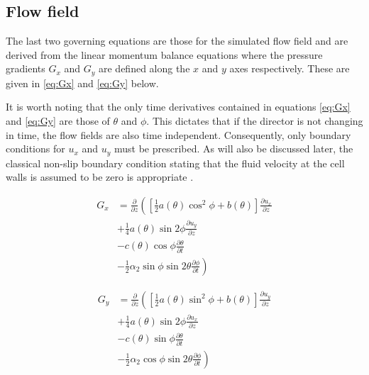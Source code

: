 \subsection{Flow field}
The last two governing equations are those for the simulated flow field and are derived from the linear momentum balance equations \cite{Cornford2008} where the pressure gradients $G_x$ and $G_y$ are defined along the $x$ and $y$ axes respectively. These are given in \ref{eq:Gx} and \ref{eq:Gy} below.

It is worth noting that the only time derivatives contained in equations \ref{eq:Gx} and \ref{eq:Gy} are those of $\theta$ and $\phi$. This dictates that if the director is not changing in time, the flow fields are also time independent. 
Consequently, only boundary conditions for $u_x$ and $u_y$ must be prescribed. As will also be discussed later, the classical non-slip boundary condition stating that the fluid velocity at the cell walls is assumed to be zero is appropriate \cite{Cornford2008,Feynmann1964}.

\begin{align}
G_x &= \frac{\partial}{\partial z}\left(\left[\frac{1}{2}a\left(\theta\right)\cos^2\phi+b\left(\theta\right)\right]\frac{\partial u_x}{\partial z} \right. \nonumber \\
&+\frac{1}{4}a\left(\theta\right)\sin2\phi\frac{\partial u_y}{\partial z} \nonumber \\
&-c\left(\theta\right)\cos\phi\frac{\partial \theta}{\partial t} \nonumber \\
&\left.-\frac{1}{2}\alpha_2\sin\phi\sin2\theta\frac{\partial \phi}{\partial t}\right)
\label{eq:Gx}
\end{align}

\begin{align}
G_y &= \frac{\partial}{\partial z}\left(\left[\frac{1}{2}a\left(\theta\right)\sin^2\phi+b\left(\theta\right)\right]\frac{\partial u_y}{\partial z} \right. \nonumber \\
&+\frac{1}{4}a\left(\theta\right)\sin2\phi\frac{\partial u_x}{\partial z} \nonumber \\
&-c\left(\theta\right)\sin\phi\frac{\partial \theta}{\partial t} \nonumber \\
&\left.-\frac{1}{2}\alpha_2\cos\phi\sin2\theta\frac{\partial \phi}{\partial t}\right)
\label{eq:Gy}
\end{align}

